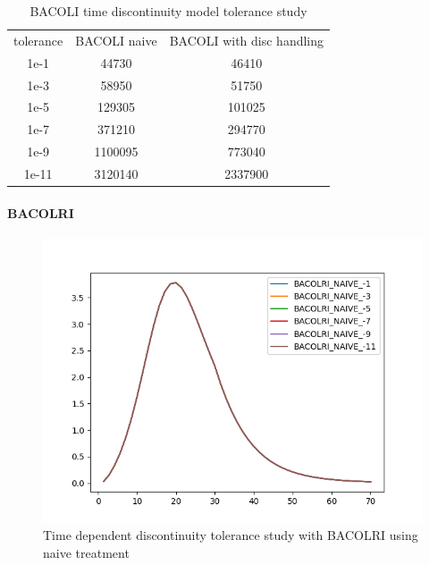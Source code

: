 \documentclass{article}
\begin{document}
\begin{table}[h]
\caption {BACOLI time discontinuity model tolerance study} 
\label{tab:BACOLI_time_tolerance}
\begin{center}
\begin{tabular}{ c c c } 
tolerance  & BACOLI naive & BACOLI with disc handling\\ 
1e-1       & 44730        &   46410     \\
1e-3       & 58950        &   51750    \\
1e-5       & 129305       &   101025    \\
1e-7       & 371210       &   294770    \\
1e-9       & 1100095      &   773040    \\
1e-11      & 3120140      &   2337900    \\
\end{tabular}
\end{center}
\end{table}

\paragraph{BACOLRI}

\begin{figure}[H]
\centering
\includegraphics[width=0.7\linewidth]{./figures/pde_time_disc_bacolri_naive_tol}
\caption{Time dependent discontinuity tolerance study with BACOLRI using naive treatment}
\label{fig:pde_time_disc_bacolri_naive_tol}
\end{figure}
\end{document}
